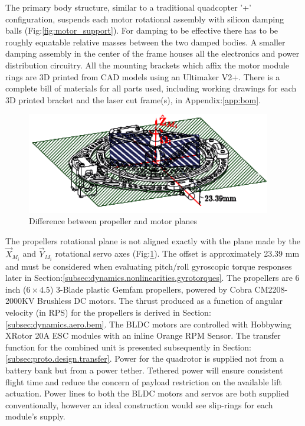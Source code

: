 \par
The primary body structure, similar to a traditional quadcopter '+' configuration, suspends each motor rotational assembly with silicon damping balls (Fig:\ref{fig:motor_support}). For damping to be effective there has to be roughly equatable relative masses between the two damped bodies. A smaller damping assembly in the center of the frame houses all the electronics and power distribution circuitry. All the mounting brackets which affix the motor module rings are 3D printed from CAD models using an Ultimaker V2+\cite{ultimaker}. There is a complete bill of materials for all parts used, including working drawings for each 3D printed bracket and the laser cut frame(s), in Appendix:\ref{app:bom}.
\par
\begin{figure}[hbtp]
\centering
\includegraphics[width=0.95\textwidth]{figs/motor-prop}
\caption{Difference between propeller and motor planes}
\label{fig:motor_prop}
\end{figure}
The propellers rotational plane is not aligned exactly with the plane made by the $\vec{X}_{M_i}$ and $\vec{Y}_{M_i}$ rotational servo axes (Fig:\ref{fig:motor_prop}). The offset is approximately 23.39 mm and must be considered when evaluating pitch/roll gyroscopic torque responses later in Section:\ref{subsec:dynamics.nonlinearities.gyrotorques}. The propellers are 6 inch ($6 \times 4.5$) 3-Blade plastic Gemfam propellers, powered by Cobra CM2208-2000KV Brushless DC motors. The thrust produced as a function of angular velocity (in RPS) for the propellers is derived in Section:\ref{subsec:dynamics.aero.bem}. 
\newpage
The BLDC motors are controlled with Hobbywing XRotor 20A ESC modules with an inline Orange RPM Sensor. The transfer function for the combined unit is presented subsequently in Section:\ref{subsec:proto.design.transfer}. Power for the quadrotor is supplied not from a battery bank but from a power tether. Tethered power will ensure consistent flight time and reduce the concern of payload restriction on the available lift actuation. Power lines to both the BLDC motors and servos are both supplied conventionally, however an ideal construction would see slip-rings for each module's supply. 
